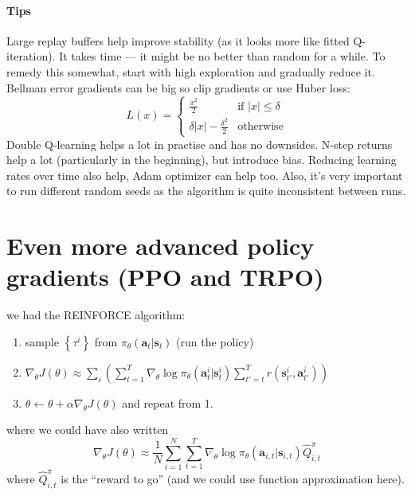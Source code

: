 \documentclass{report}
\begin{document}
\subsubsection{Tips} Large replay buffers help improve stability (as it looks more like fitted Q-iteration).
It takes time --- it might be no better than random for a while. To remedy this somewhat, start with high exploration and gradually reduce it.
Bellman error gradients can be big so clip gradients or use Huber loss:
\begin{equation}
		L(x) = \left\{
				\begin{array}{ll}
						\frac{x^2}{2} & \text{if } |x|\leq \delta \\
						\delta|x| - \frac{\delta^2}{2} & \text{otherwise}
				\end{array}
				\right .
\end{equation}
Double Q-learning helps a lot in practise and has no downsides.
N-step returns help a lot (particularly in the beginning), but introduce bias.
Reducing learning rates over time also help, Adam optimizer can help too.
Also, it's very important to run different random seeds as the algorithm is quite inconsistent between runs.

\chapter{Even more advanced policy gradients (PPO and TRPO)}
we had the REINFORCE algorithm:
\begin{enumerate}
		\item sample $ \left\{ \tau^{ i } \right\}   $ from $ \pi_{ \theta } (\bm{a}_{t}| \bm{s}_{t} )  $ (run the policy)
		\item $ \nabla_{ \theta } J (\theta) \approx \sum_{i}^{} \left( \sum_{t=1}^{T} \nabla_{ \theta } \log \pi_{ \theta } (\bm{a}_{t}^{ i }| \bm{s}_{t}^{ i } )
		\sum_{t'=t}^{T} r (\bm{s}_{t'}^{ i }, \bm{a}_{t'}^{ i } ) \right)   $
\item $ \theta \leftarrow \theta + \alpha \nabla_{ \theta } J (\theta)  $ and repeat from 1.
\end{enumerate}
where we could have also written
\begin{equation}
		\nabla_{ \theta } J (\theta) \approx \frac{1}{N} \sum_{i=1}^{N} \sum_{t=1}^{T} \nabla_{ \theta } \log \pi_{ \theta } (\bm{a}_{i,t}| \bm{s}_{i,t} ) \hat{Q}_{ i,t }^{ \pi }
\end{equation}
where $ \hat{Q}_{ i,t }^{ \pi }  $ is the ``reward to go'' (and we could use function approximation here).
\end{document}
